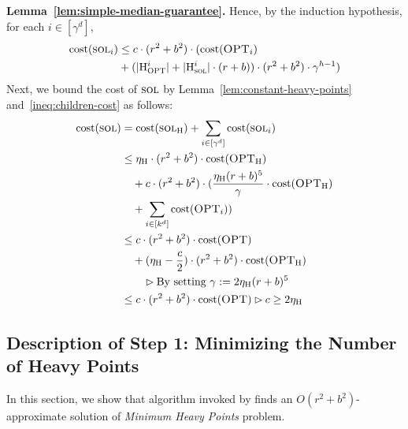 \begin{proofof}{\bf Lemma~\ref{lem:simple-median-guarantee}.}
Hence, by the induction hypothesis, for each $i\in [\gamma^d]$,
\begin{align}\label{ineq:children-cost}
\mathrm{cost}(\textsc{sol}_i) 
&\leq  c\cdot (r^2 + b^2) \cdot (\mathrm{cost}(\textsc{OPT}_i) \nonumber \\ 
&+ (|\mathrm{H}^i _{\textsc{OPT}}| + |\mathrm{H}^i_{\textsc{sol}}| \cdot (r+b)) \cdot (r^2 + b^2) \cdot \gamma^{h-1})
\end{align}
Next, we bound the cost of $\textsc{sol}$ by Lemma~\ref{lem:constant-heavy-points} and~\eqref{ineq:children-cost} as follows: 
\begin{align*}
\cost(\sol) &= \cost(\sol_{\heavy}) + \sum_{i\in[\gamma^d]} \cost(\sol_{i}) \\
			 &\leq \eta_{\heavy}\cdot (r^2 + b^2) \cdot \cost(\opt_{\heavy}) \\
			 &\quad + c \cdot (r^2+b^2) \cdot ({\eta_{\heavy} (r+b)^5\over \gamma} \cdot \cost(\opt_{\heavy}) \\ 
			 &\quad + \sum_{i\in [k^d]}\cost(\opt_i))\\%
			 &\leq c\cdot (r^2 + b^2) \cdot \cost(\opt) \\
			 &\quad + (\eta_\heavy - {c\over 2})\cdot (r^2+ b^2) \cdot \cost(\opt_{\heavy}) \\
			 &\qquad \rhd \text{By setting } \gamma := 2\eta_{\heavy}(r+b)^5\\
			 &\leq c\cdot (r^2 + b^2) \cdot \cost(\opt) \rhd c \geq 2\eta_\heavy
\end{align*}
\end{proofof}
\fi


\subsection{Description of Step 1: Minimizing the Number of Heavy Points}\label{sec:heavy-points}
In this section, we show that \Call{\minHeavy} algorithm invoked by \Call{\fairletDec} finds an $O(r^2 + b^2)$-approximate solution of {\em Minimum Heavy Points} problem. %

